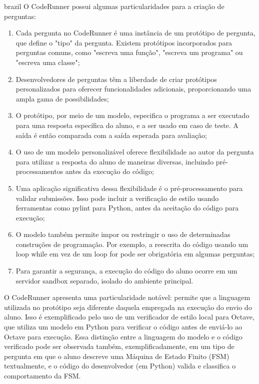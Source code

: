 \begin{otherlanguage*}{brazil}
O CodeRunner possui algumas particularidades para a criação de perguntas:

\begin{enumerate} [label=(\alph*)]
    \item Cada pergunta no CodeRunner é uma instância de um protótipo de pergunta, que define o "tipo" da pergunta. Existem protótipos incorporados para perguntas comuns, como "escreva uma função", "escreva um programa" ou "escreva uma classe";
    \item Desenvolvedores de perguntas têm a liberdade de criar protótipos personalizados para oferecer funcionalidades adicionais, proporcionando uma ampla gama de possibilidades;
    \item O protótipo, por meio de um modelo, especifica o programa a ser executado para uma resposta específica do aluno, e a ser usado em caso de teste. A saída é então comparada com a saída esperada para avaliação;
    \item O uso de um modelo personalizável oferece flexibilidade ao autor da pergunta para utilizar a resposta do aluno de maneiras diversas, incluindo pré-processamentos antes da execução do código;
    \item Uma aplicação significativa dessa flexibilidade é o pré-processamento para validar submissões. Isso pode incluir a verificação de estilo usando ferramentas como pylint para Python, antes da aceitação do código para execução;
    \item O modelo também permite impor ou restringir o uso de determinadas construções de programação. Por exemplo, a reescrita do código usando um loop while em vez de um loop for pode ser obrigatória em algumas perguntas;
    \item Para garantir a segurança, a execução do código do aluno ocorre em um servidor sandbox separado, isolado do ambiente principal.
\end{enumerate}

O CodeRunner apresenta uma particularidade notável: permite que a linguagem utilizada no protótipo seja diferente daquela empregada na execução do envio do aluno. Isso é exemplificado pelo uso de um verificador de estilo local para Octave, que utiliza um modelo em Python para verificar o código antes de enviá-lo ao Octave para execução. Essa distinção entre a linguagem do modelo e o código verificado pode ser observada também, exemplificadamente, em um tipo de pergunta em que o aluno descreve uma Máquina de Estado Finito (FSM) textualmente, e o código do desenvolvedor (em Python) valida e classifica o comportamento da FSM.


\end{otherlanguage*}
